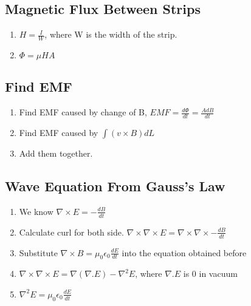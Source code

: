 \documentclass{article}
\begin{document}
   \subsection{Magnetic Flux Between Strips}
   \begin{enumerate}
   \item    $ H = \frac{I}{W} $, where W is the width of the strip.
   \item  $\Phi = \mu HA$
   \end{enumerate}
   
   \subsection{Find EMF}
   \begin{enumerate}
   \item Find EMF caused by change of B, $EMF = \frac{d\Phi}{dt} = \frac{A dB}{dt}$
   \item Find EMF caused by $\int (v\times B)dL$
   \item Add them together.
   \end{enumerate}

   \subsection{Wave Equation From Gauss's Law}
   
   \begin{enumerate}
     \item We know $\nabla\times E= -\frac{dB}{dt}$
     \item Calculate curl for both side. $\nabla \times \nabla \times E = \nabla \times \nabla \times -\frac{dB}{dt}$
     \item Substitute $\nabla \times B = \mu_0\epsilon_0\frac{dE}{dt}$ into the equation obtained before
     \item $\nabla \times \nabla \times E  = \nabla (\nabla .E) - \nabla^2E$, where $\nabla .E$ is 0 in vacuum
     \item $\nabla^2E = \mu_0\epsilon_0\frac{dE}{dt}$
   \end{enumerate}
  
\end{document}
